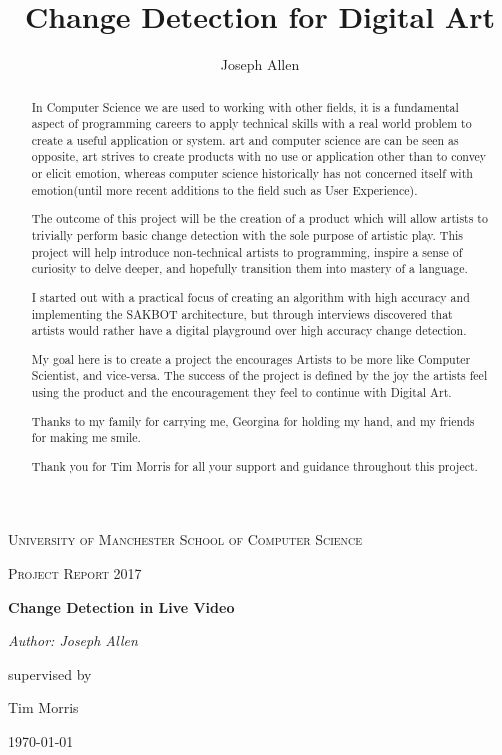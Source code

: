 \documentclass[a4paper]{report}
\title{Change Detection for Digital Art}
\author{Joseph Allen}
\begin{document}
\begin{titlepage}
	\centering
	{\scshape\LARGE University of Manchester School of Computer Science \par}
	\vspace{1cm}
	{\scshape\Large Project Report 2017\par}
	\vspace{1.5cm}
	{\huge\bfseries Change Detection in Live Video\par}
	\vspace{2cm}
	{\Large\itshape Author: Joseph Allen\par}
	supervised by\par
	Tim Morris

	\vfill

	{\large \today\par}
\end{titlepage}

\begin{abstract}
In Computer Science we are used to working with other fields, it is a fundamental aspect of programming careers to apply technical skills with a real world problem to create a useful application or system. art and computer science are can be seen as opposite, art strives to create products with no use or application other than to convey or elicit emotion, whereas computer science historically has not concerned itself with emotion(until more recent additions to the field such as User Experience). 

The outcome of this project will be the creation of a product which will allow artists to trivially perform basic change detection with the sole purpose of artistic play. This project will help introduce non-technical artists to programming, inspire a sense of curiosity to delve deeper, and hopefully transition them into mastery of a language.

I started out with a practical focus of creating an algorithm with high accuracy and implementing the SAKBOT architecture, but through interviews discovered that artists would rather have a digital playground over high accuracy change detection.

My goal here is to create a project the encourages Artists to be more like Computer Scientist, and vice-versa. The success of the project is defined by the joy the artists feel using the product and the encouragement they feel to continue with Digital Art.
\end{abstract}

\renewcommand{\abstractname}{Acknowledgements}
\begin{abstract}
Thanks to my family for carrying me, Georgina for holding my hand, and my friends for making me smile.

Thank you for Tim Morris for all your support and guidance throughout this project.
\end{abstract}
\end{document}
